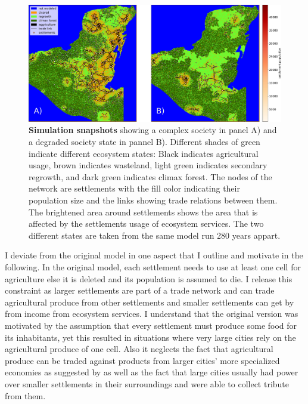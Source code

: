 \begin{figure}[!t]
\centering
\includegraphics[width=\textwidth]{figures/map_plots.pdf}
\caption[Simulation snapshots of the MayaSim model]{\textbf{Simulation snapshots} showing a complex society in panel A) and a degraded society state in pannel B). Different shades of green indicate different ecosystem states: Black indicates agricultural usage, brown indicates wasteland, light green indicates secondary regrowth, and dark green indicates climax forest. The nodes of the network are settlements with the fill color indicating their population size and the links showing trade relations between them. The brightened area around settlements shows the area that is affected by the settlements usage of ecosystem services. The two different states are taken from the same model run 280 years appart.}
\label{fig:model_snapshot}
\end{figure}

I deviate from the original model in one aspect that I outline and motivate in the following.
In the original model, each settlement needs to use at least one cell for agriculture else it is deleted and its population is assumed to die. I release this constraint as larger settlements are part of a trade network and can trade agricultural produce from other settlements and smaller settlements can get by from income from ecosystem services. I understand that the original version was motivated by the assumption that every settlement must produce some food for its inhabitants, yet this resulted in situations where very large cities rely on the agricultural produce of one cell. Also it neglects the fact that agricultural produce can be traded against products from larger cities' more specialized economies as suggested by \cite{Dahlin2007} as well as the fact that large cities usually had power over smaller settlements in their surroundings and were able to collect tribute from them.


